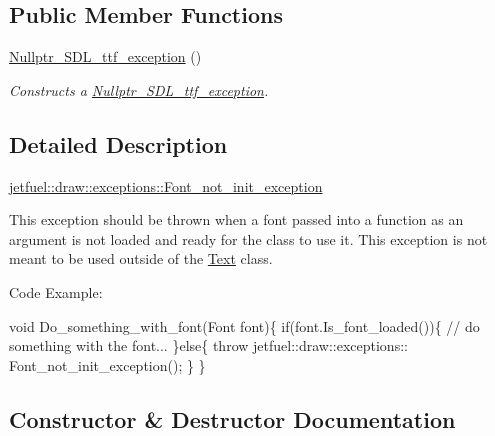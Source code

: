 \subsection*{Public Member Functions}
\begin{DoxyCompactItemize}
\item 
\hyperlink{classjetfuel_1_1draw_1_1exceptions_1_1Nullptr__SDL__ttf__exception_ac6644eee07afa5a2f8a972f98905f250}{Nullptr\+\_\+\+S\+D\+L\+\_\+ttf\+\_\+exception} ()
\begin{DoxyCompactList}\small\item\em Constructs a \hyperlink{classjetfuel_1_1draw_1_1exceptions_1_1Nullptr__SDL__ttf__exception}{Nullptr\+\_\+\+S\+D\+L\+\_\+ttf\+\_\+exception}. \end{DoxyCompactList}\end{DoxyCompactItemize}


\subsection{Detailed Description}
\hyperlink{classjetfuel_1_1draw_1_1exceptions_1_1Font__not__init__exception}{jetfuel\+::draw\+::exceptions\+::\+Font\+\_\+not\+\_\+init\+\_\+exception}

This exception should be thrown when a font passed into a function as an argument is not loaded and ready for the class to use it. This exception is not meant to be used outside of the \hyperlink{classjetfuel_1_1draw_1_1Text}{Text} class.

Code Example\+:

void Do\+\_\+something\+\_\+with\+\_\+font(\+Font font)\{ if(font.\+Is\+\_\+font\+\_\+loaded())\{ // do something with the font... \}else\{ throw jetfuel\+::draw\+::exceptions\+:\+: Font\+\_\+not\+\_\+init\+\_\+exception(); \} \} 

\subsection{Constructor \& Destructor Documentation}
\mbox{\label{classjetfuel_1_1draw_1_1exceptions_1_1Nullptr__SDL__ttf__exception_ac6644eee07afa5a2f8a972f98905f250}} 

